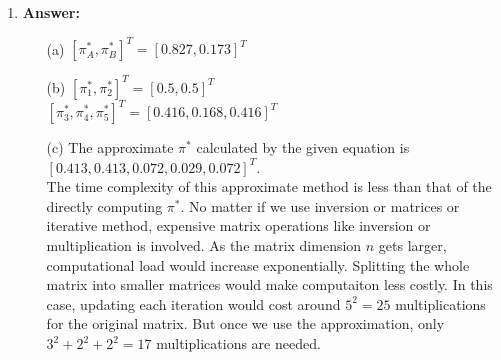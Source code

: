 \documentclass[12pt]{article}
\begin{document}
\begin{enumerate}
\item{} \textbf{Answer:}
\begin{itemize}
\item[(a)] $[\pi^*_A,\pi^*_B]^T=[0.827,0.173]^T$
\item[(b)] $[\pi^*_1,\pi^*_2]^T=[0.5,0.5]^T$\\
$[\pi^*_3,\pi^*_4,\pi^*_5]^T=[0.416,0.168,0.416]^T$
\item[(c)] The approximate $\pi^*$ calculated by the given equation is $[0.413, 0.413, 0.072, 0.029, 0.072]^T$.
\smallskip\\
The time complexity of this approximate method is less than that of the directly computing $\pi^*$. No matter if we use inversion or matrices or iterative method, expensive matrix operations like inversion or multiplication is involved. As the matrix dimension $n$ gets larger, computational load would increase exponentially. Splitting the whole matrix into smaller matrices would make computaiton less costly. In this case, updating each iteration would cost around $5^2=25$ multiplications for the original matrix. But once we use the approximation, only $3^2+2^2+2^2=17$ multiplications are needed.
\end{itemize}


\end{enumerate}
\end{document}
